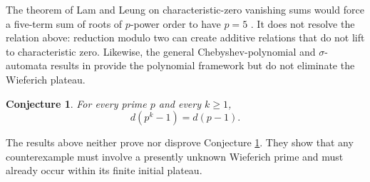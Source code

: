 \documentclass[a4paper]{article}
\newtheorem{conjecture}[theorem]{Conjecture}
\begin{document}
The theorem of Lam and Leung on characteristic-zero vanishing sums would force a five-term sum of roots of $p$-power order to have $p=5$ \cite{LamLeung2000}.
It does not resolve the relation above: reduction modulo two can create additive relations that do not lift to characteristic zero.
Likewise, the general Chebyshev-polynomial and $\sigma$-automata results in
\cite{Sutner2000,HUNZIKER2004465} provide the polynomial framework but do not eliminate the Wieferich plateau.

\begin{conjecture}\label{conj:all-primes}
	For every prime $p$ and every $k\geq1$,
	\[
		d(p^k-1)=d(p-1).
	\]
\end{conjecture}

The results above neither prove nor disprove Conjecture \ref{conj:all-primes}.
They show that any counterexample must involve a presently unknown Wieferich prime and must already occur within its finite initial plateau.



\end{document}
